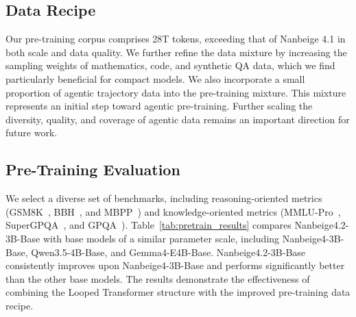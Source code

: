 \subsection{Data Recipe}


Our pre-training corpus comprises 28T tokens, exceeding that of Nanbeige 4.1 in both scale and data quality.
We further refine the data mixture by increasing the sampling weights of mathematics, code, and synthetic QA data, which we find particularly beneficial for compact models. We also incorporate a small proportion of agentic trajectory data into the pre-training mixture.
This mixture represents an initial step toward agentic pre-training. Further scaling the diversity, quality, and coverage of agentic data remains an important direction for future work.

\subsection{Pre-Training Evaluation}

We select a diverse set of benchmarks, including reasoning-oriented metrics (GSM8K~\cite{cobbe2021training}, BBH~\cite{suzgun2023challenging}, and MBPP~\cite{austin2021program}) and knowledge-oriented metrics (MMLU-Pro~\cite{wang2024mmlu}, SuperGPQA~\cite{du2026supergpqa}, and GPQA~\cite{rein2023gpqa}). Table~\ref{tab:pretrain_results} compares Nanbeige4.2-3B-Base with base models of a similar parameter scale, including Nanbeige4-3B-Base, Qwen3.5-4B-Base, and Gemma4-E4B-Base. Nanbeige4.2-3B-Base consistently improves upon Nanbeige4-3B-Base and performs significantly better than the other base models. The results demonstrate the effectiveness of combining the Looped Transformer structure with the improved pre-training data recipe.


